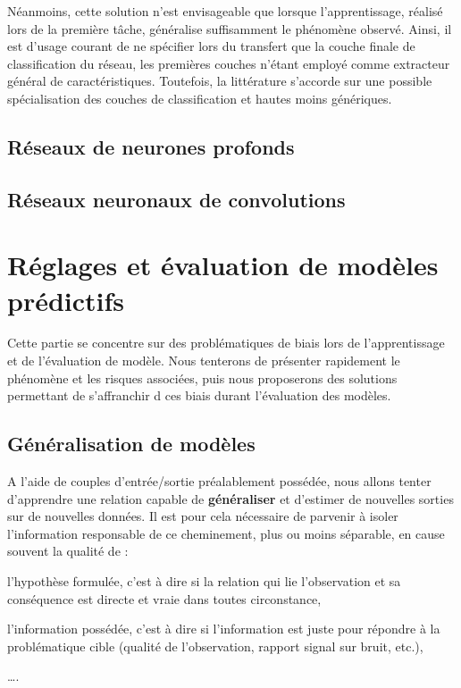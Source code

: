Néanmoins, cette solution n’est envisageable que lorsque l’apprentissage, réalisé lors de la première tâche, généralise suffisamment le phénomène observé. Ainsi, il est d’usage courant de ne spécifier lors du transfert que la couche finale de classification du réseau, les premières couches n’étant employé comme extracteur général de caractéristiques. Toutefois, la littérature s’accorde sur une possible spécialisation des couches de classification et hautes moins génériques.
\subsection{Réseaux de neurones profonds}
\subsection{Réseaux neuronaux de convolutions}

\clearpage

\section{Réglages et évaluation de modèles prédictifs}
Cette partie se concentre sur des problématiques de biais lors de l'apprentissage et de l'évaluation de modèle. Nous tenterons de présenter rapidement le phénomène et les risques associées, puis nous proposerons des solutions permettant de s'affranchir d ces biais durant l'évaluation des modèles.\par

\subsection{Généralisation de modèles}
\label{subsec:generalized_models}
A l'aide de couples d'entrée/sortie préalablement possédée, nous allons tenter d’apprendre une relation capable de \textbf{généraliser} et d’estimer de nouvelles sorties sur de nouvelles données. Il est pour cela nécessaire de parvenir à isoler l'information responsable de ce cheminement, plus ou moins séparable, en cause souvent la qualité de :
\begin{inlinerate}
    \item l'hypothèse formulée, c'est à dire si la relation qui lie l'observation et sa conséquence est directe et vraie dans toutes circonstance,
    \item l'information possédée, c'est à dire si l'information est juste pour répondre à la problématique cible (qualité de l'observation, rapport signal sur bruit, etc.),
    \item \ldots.
\end{inlinerate}\par 

